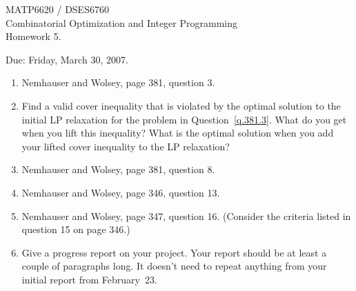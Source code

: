 \documentclass[12pt]{article}
\begin{document}
\begin{center}
  \begin{large}
     MATP6620 / DSES6760 \\
Combinatorial Optimization and Integer Programming \\
       Homework 5.
  \end{large}
\end{center}

\begin{flushright}
   Due:  Friday, March 30, 2007.
\end{flushright}



\begin{enumerate}
\item Nemhauser and Wolsey, page 381, question 3.  \label{q.381.3}
\item Find a valid cover inequality that is violated by the optimal solution to the initial LP relaxation
for the problem in Question~\ref{q.381.3}.
What do you get when you lift this inequality?
What is the optimal solution when you add your lifted cover inequality to the LP relaxation?
\item Nemhauser and Wolsey, page 381, question 8.

\item Nemhauser and Wolsey, page 346, question 13.
\item Nemhauser and Wolsey, page 347, question 16.
(Consider the criteria listed in question 15 on page 346.)

\item Give a progress report on your project. Your report should be at least a couple of
paragraphs long. It doesn't need to repeat anything from your initial report from February~23.



\end{enumerate}
\end{document}
